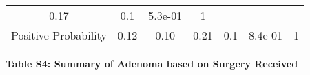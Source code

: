 \documentclass[12pt,]{article}
\begin{document}
\begin{longtable}[]{@{}ccccccc@{}}
\begin{minipage}[t]{0.15\columnwidth}
0.17\strut
\end{minipage} & \begin{minipage}[t]{0.09\columnwidth}\centering\strut
0.1\strut
\end{minipage} & \begin{minipage}[t]{0.07\columnwidth}\centering\strut
5.3e-01\strut
\end{minipage} & \begin{minipage}[t]{0.10\columnwidth}\centering\strut
1\strut
\end{minipage}\tabularnewline
\begin{minipage}[t]{0.14\columnwidth}\centering\strut
Positive Probability\strut
\end{minipage} & \begin{minipage}[t]{0.16\columnwidth}\centering\strut
0.12\strut
\end{minipage} & \begin{minipage}[t]{0.10\columnwidth}\centering\strut
0.10\strut
\end{minipage} & \begin{minipage}[t]{0.15\columnwidth}\centering\strut
0.21\strut
\end{minipage} & \begin{minipage}[t]{0.09\columnwidth}\centering\strut
0.1\strut
\end{minipage} & \begin{minipage}[t]{0.07\columnwidth}\centering\strut
8.4e-01\strut
\end{minipage} & \begin{minipage}[t]{0.10\columnwidth}\centering\strut
1\strut
\end{minipage}\tabularnewline
\bottomrule
\end{longtable}

\normalsize

\newpage

\textbf{Table S4: Summary of Adenoma based on Surgery Received}
\end{document}
